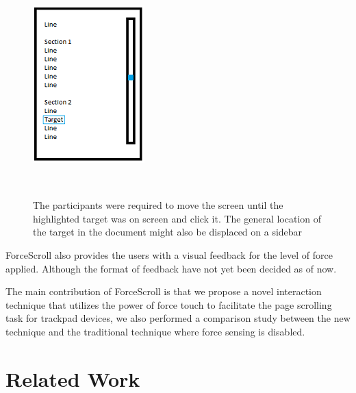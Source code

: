 \documentclass{sigchi}
\begin{document}
\begin{figure}[!h]
	\centering
	\includegraphics[width=0.6\columnwidth]{figures/Capture}
	\caption{The participants were required to move the screen until the highlighted target was on screen and click it. The general location of the target in the document might also be displaced on a sidebar}~\label{fig:figure1}
\end{figure}

ForceScroll also provides the users with a visual feedback for the level of force applied. Although the format of feedback have not yet been decided as of now.

The main contribution of ForceScroll is that we propose a novel interaction technique that utilizes the power of force touch to facilitate the page scrolling task for trackpad devices, we also performed a comparison study between the new technique and the traditional technique where force sensing is disabled.

\section{Related Work}
\end{document}
